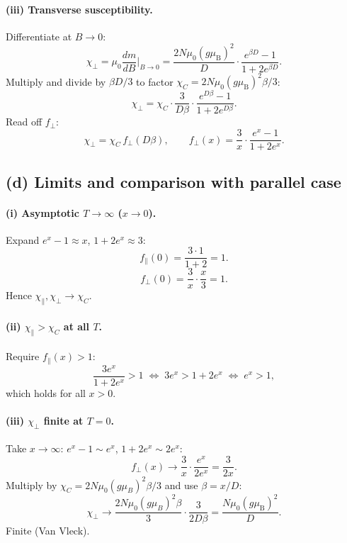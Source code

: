 \documentclass[11pt]{article}
\begin{document}
\paragraph{(iii) Transverse susceptibility.} Differentiate at $B\to 0$:
\begin{equation}
\chi_{\perp}=\mu_{0}\frac{dm}{dB}\bigg|_{B\to 0}=\frac{2N\mu_{0}(g\mu_{\mathrm B})^{2}}{D}\cdot\frac{e^{\beta D}-1}{1+2e^{\beta D}}.
\label{eq:chiperp-raw}
\end{equation}
Multiply and divide by $\beta D/3$ to factor $\chi_C=2N\mu_0(g\mu_{\mathrm B})^2\beta/3$:
\begin{equation}
\chi_{\perp}=\chi_C\cdot\frac{3}{D\beta}\cdot\frac{e^{D\beta}-1}{1+2e^{D\beta}}.
\label{eq:chiperp-form}
\end{equation}
Read off $f_\perp$:
\begin{equation}
\boxed{\,\chi_{\perp}=\chi_{C}\,f_{\perp}(D\beta),\qquad f_{\perp}(x)=\frac{3}{x}\cdot\frac{e^{x}-1}{1+2e^{x}}.\,}
\label{eq:fperp}
\end{equation}

\subsection*{(d) Limits and comparison with parallel case}

\paragraph{(i) Asymptotic $T\to\infty$ ($x\to 0$).} Expand $e^x-1\approx x$, $1+2e^x\approx 3$:
\begin{equation}
f_{\parallel}(0)=\frac{3\cdot 1}{1+2}=1.
\end{equation}
\begin{equation}
f_{\perp}(0)=\frac{3}{x}\cdot\frac{x}{3}=1.
\end{equation}
Hence $\chi_\parallel,\chi_\perp\to\chi_C$.

\paragraph{(ii) $\chi_{\parallel}>\chi_{C}$ at all $T$.} Require $f_\parallel(x)>1$:
\begin{equation}
\frac{3e^{x}}{1+2e^{x}}>1\;\Longleftrightarrow\;3e^{x}>1+2e^{x}\;\Longleftrightarrow\;e^{x}>1,
\label{eq:fpar-ineq}
\end{equation}
which holds for all $x>0$.

\paragraph{(iii) $\chi_{\perp}$ finite at $T=0$.} Take $x\to\infty$: $e^x-1\sim e^x$, $1+2e^x\sim 2e^x$:
\begin{equation}
f_\perp(x)\to\frac{3}{x}\cdot\frac{e^x}{2e^x}=\frac{3}{2x}.
\end{equation}
Multiply by $\chi_C=2N\mu_0(g\mu_B)^2\beta/3$ and use $\beta=x/D$:
\begin{equation}
\chi_\perp\to\frac{2N\mu_0(g\mu_B)^2\beta}{3}\cdot\frac{3}{2D\beta}=\frac{N\mu_{0}(g\mu_{\mathrm B})^{2}}{D}.
\label{eq:chiperp-zeroT}
\end{equation}
Finite (Van Vleck).
\end{document}
